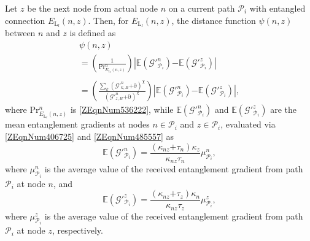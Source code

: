 \documentclass[11pt]{article}%
\begin{document}
Let $z$ be the next node from actual node $n$ on a current path ${\mathcal{P}}_i$ with entangled connection $E_{{\mathrm{L}}_l}\left(n,z\right)$. Then, for $E_{{\mathrm{L}}_l}\left(n,z\right)$, the distance function $\psi \left(n,z\right)$ between $n$ and $z$ is defined as
\begin{equation} \label{ZEqnNum867276} 
 \begin{array}{l}
\psi \left(n,z\right)\\\mathrm{=}\left(\frac{\mathrm{1}}{\mathrm{P}{\mathrm{r}}^n_{E_{{\mathrm{L}}_l}\left(n,z\right)}}\right)\left|\mathbb{E}\left({\mathcal{G}}'^n_{{\mathcal{P}}_i}\right)\mathrm{-}\mathbb{E}\left({\mathcal{G}}'^z_{{\mathcal{P}}_i}\right)\right| \\ 
\\\mathrm{=}\left(\frac{\sum_k{{\left({\mathcal{G}}'^n_{k,B}\mathrm{+}\mathrm{\partial }\right)}^{\chi }}}{{\left({\mathcal{G}}'^n_{z,B}\mathrm{+}\mathrm{\partial }\right)}^{\chi }}\right)\left|\mathbb{E}\left({\mathcal{G}}'^n_{{\mathcal{P}}_i}\right)\mathrm{-}\mathbb{E}\left({\mathcal{G}}'^z_{{\mathcal{P}}_i}\right)\right|, \end{array}
\end{equation} 
where $\mathrm{P}{\mathrm{r}}^n_{E_{{\mathrm{L}}_l}\left(n,z\right)}$ is \eqref{ZEqnNum536222}, while $\mathbb{E}\left({\mathcal{G}}'^n_{{\mathcal{P}}_i}\right)$ and $\mathbb{E}\left({\mathcal{G}}'^z_{{\mathcal{P}}_i}\right)$ are the mean entanglement gradients at nodes $n\mathrm{\in }{\mathcal{P}}_i$ and $z\mathrm{\in }{\mathcal{P}}_i$, evaluated via \eqref{ZEqnNum406725} and \eqref{ZEqnNum485557} as
\begin{equation} \label{37)} 
\mathbb{E}\left({\mathcal{G}}'^n_{{\mathcal{P}}_i}\right)\mathrm{=}\frac{\left({\kappa }_{nz}\mathrm{+}{\tau }_n\right){\kappa }_z}{{\kappa }_{nz}{\tau }_n}{\mu }^n_{{\mathcal{P}}_i},                                                                     
\end{equation} 
where ${\mu }^n_{{\mathcal{P}}_i}$ is the average value of the received entanglement gradient from path ${\mathcal{P}}_i$ at node $n$, and
\begin{equation} \label{38)} 
\mathbb{E}\left({\mathcal{G}}'^z_{{\mathcal{P}}_i}\right)\mathrm{=}\frac{\left({\kappa }_{nz}\mathrm{+}{\tau }_z\right){\kappa }_n}{{\kappa }_{nz}{\tau }_z}{\mu }^z_{{\mathcal{P}}_i},                                                                       
\end{equation} 
where ${\mu }^z_{{\mathcal{P}}_i}$ is the average value of the received entanglement gradient from path ${\mathcal{P}}_i$ at node $z$, respectively.
\end{document}
